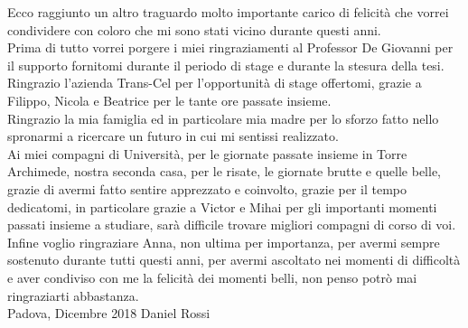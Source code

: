 
Ecco raggiunto un altro traguardo molto importante carico di felicità che vorrei condividere con coloro che mi sono stati vicino durante questi anni.\\
\newline
Prima di tutto vorrei porgere i miei ringraziamenti al Professor De Giovanni per il supporto fornitomi durante il periodo di stage e durante la stesura della tesi.\\
\newline
Ringrazio l'azienda Trans-Cel per l'opportunità di stage offertomi, grazie a Filippo, Nicola e Beatrice per le tante ore passate insieme.\\
\newline
Ringrazio la mia famiglia ed in particolare mia madre per lo sforzo fatto nello spronarmi a ricercare un futuro in cui mi sentissi realizzato.\\
\newline
Ai miei compagni di Università, per le giornate passate insieme in Torre Archimede, nostra seconda casa, per le risate, le giornate brutte e quelle belle, grazie di avermi fatto sentire apprezzato e coinvolto, grazie per il tempo dedicatomi, in particolare grazie a Victor e Mihai per gli importanti momenti passati insieme a studiare, sarà difficile trovare migliori compagni di corso di voi.\\
\newline
Infine voglio ringraziare Anna, non ultima per importanza, per avermi sempre sostenuto durante tutti questi anni, per avermi ascoltato nei momenti di difficoltà e aver condiviso con me la felicità dei momenti belli, non penso potrò mai ringraziarti abbastanza.\\
\newline
Padova, Dicembre 2018 \hfill Daniel Rossi
